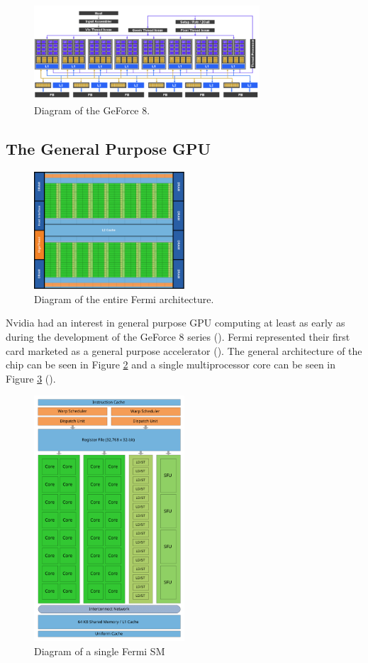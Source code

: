 \begin{figure}[h]
    \centering
    \includegraphics[width=0.75\textwidth]{assets/geforce8.png}
    \caption{Diagram of the GeForce 8.}
    \label{fig:geforce8}
\end{figure}

\subsection{The General Purpose GPU}


\begin{figure}[h]
    \centering
    \includegraphics[width=0.5\textwidth]{assets/fermi_architecture1.png}
    \caption{Diagram of the entire Fermi architecture.}
    \label{fig:fermi}
\end{figure}

Nvidia had an interest in general purpose GPU computing at least as early as during the development
of the GeForce 8 series (\cite{dally2021evolution}).
Fermi represented their first card marketed as a general purpose accelerator (\cite{nvidiafermi}).
The general architecture of the chip can be seen in Figure \ref{fig:fermi} and a single 
multiprocessor core can be seen in Figure \ref{fig:fermiSM} (\cite{nvidiafermi}).


\begin{figure}[h]
    \centering
    \includegraphics[width=0.5\textwidth]{assets/Fermi.svg.png}
    \caption{Diagram of a single Fermi SM} 
    \label{fig:fermiSM}
\end{figure}
